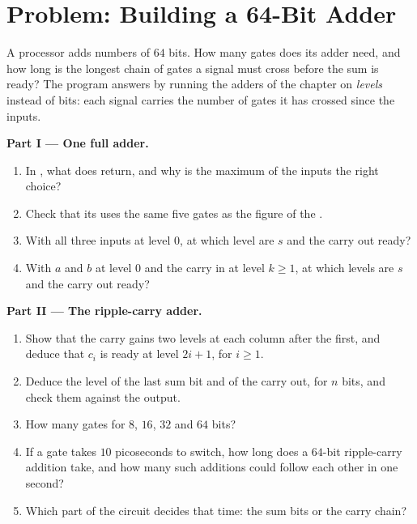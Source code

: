 \section{Problem: Building a 64-Bit Adder}\label{sec:g11:gates-to-arithmetic-unit:problem}

\begin{problem}\label{pb:g11:gates-to-arithmetic-unit:1}
A processor adds numbers of $64$ bits. How many gates does its adder need, and how long is the longest chain of gates
a signal must cross before the sum is ready? The program  answers by running the adders of the
chapter on \emph{levels} instead of bits: each signal carries the number of gates it has crossed since the inputs.

\label{lst:g11:gates-to-arithmetic-unit:gate-count}

\label{out:g11:gates-to-arithmetic-unit:gate-count}

\medskip\noindent\textbf{Part I --- One full adder.}
\begin{enumerate}
  \item In , what does  return, and why is the maximum of the inputs the right choice?
  \item Check that its  uses the same five gates as the figure of the .
  \item With all three inputs at level $0$, at which level are $s$ and the carry out ready?
  \item With $a$ and $b$ at level $0$ and the carry in at level $k \ge 1$, at which levels are $s$ and the carry out
    ready?
\end{enumerate}

\medskip\noindent\textbf{Part II --- The ripple-carry adder.}
\begin{enumerate}[resume]
  \item Show that the carry gains two levels at each column after the first, and deduce that $c_i$ is ready at level
    $2i + 1$, for $i \ge 1$.
  \item Deduce the level of the last sum bit and of the carry out, for $n$ bits, and check them against the output.
  \item How many gates for $8$, $16$, $32$ and $64$ bits?
  \item If a gate takes $10$ picoseconds to switch, how long does a $64$-bit ripple-carry addition take, and how many
    such additions could follow each other in one second?
  \item Which part of the circuit decides that time: the sum bits or the carry chain?
\end{enumerate}


\end{problem}
